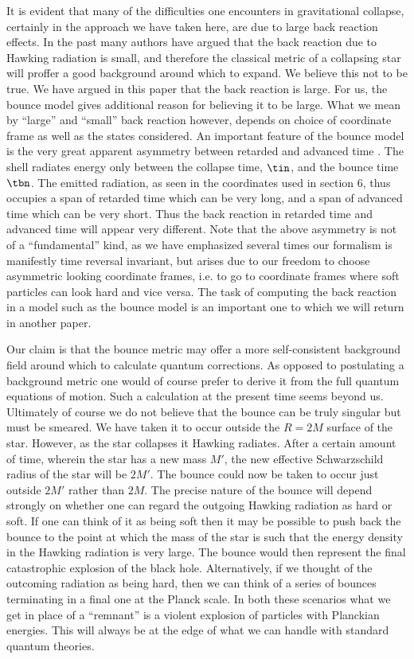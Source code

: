 It is evident that many of the difficulties one encounters in
gravitational collapse, certainly in the approach we have taken here,
are due to large back reaction effects. In the past many authors have
argued that the back reaction due to Hawking radiation is small, and
therefore the classical metric of a collapsing star will proffer a good
background around which to expand. We believe this not to be true. We
have argued in this paper that the back reaction is large. For us, the
bounce model gives additional reason for believing it to be large. What
we mean by ``large'' and ``small'' back reaction however, depends
on choice of coordinate frame as well as the states considered. An
important feature of the bounce model is the very great apparent
asymmetry between retarded and advanced time . The shell radiates
energy only between the collapse time, $\tin$, and the bounce time
$\tbn$. The emitted radiation, as seen in the coordinates used in
section 6, thus occupies a span of retarded time which can be very
long, and a span of advanced time which can be very short. Thus the
back reaction in retarded time and advanced time will appear very
different. Note that the above asymmetry is not of a
``fundamental'' kind, as we have emphasized several times our formalism
is manifestly time reversal invariant, but arises due to our freedom to
choose asymmetric looking coordinate frames, i.e. to go to coordinate
frames where soft particles can look hard and vice versa. The task of
computing the back reaction in a model such as the bounce model is an
important one to which we will return in another paper.

Our claim is that the bounce metric may offer a more self-consistent
background field around which to calculate quantum corrections. As
opposed to postulating a background metric one would of course prefer
to derive it from the full quantum equations of motion. Such a
calculation at the present time seems beyond us. Ultimately of course
we do not believe that the bounce can be truly singular but must be
smeared. We have taken it to occur outside the $R=2M$ surface of the
star. However, as the star collapses it Hawking radiates.  After a
certain amount of time, wherein the star has a new mass $M'$, the new
effective Schwarzschild radius of the star will be $2M'$. The bounce
could now be taken to occur just outside $2M'$ rather than $2M$. The
precise nature of the bounce will depend strongly on whether one can
regard the outgoing Hawking radiation as hard or soft. If one can think
of it as being soft then it may be possible to push back the bounce to
the point at which the mass of the star is such that the energy density
in the Hawking radiation is very large. The bounce would then represent
the final catastrophic explosion of the black hole. Alternatively, if
we thought of the outcoming radiation as being hard, then we can think
of a series of bounces terminating in a final one at the Planck scale.
In both these scenarios what we get in place of a ``remnant'' is a
violent explosion of particles with Planckian energies. This will
always be at the edge of what we can handle with standard quantum
theories.

